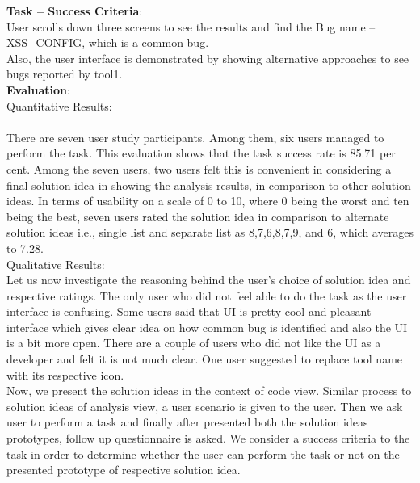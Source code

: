 \textbf{Task – Success Criteria}: \\

User scrolls down three screens to see the results and find the Bug name – XSS\_CONFIG, which is a common bug. \\

Also, the user interface is demonstrated by showing alternative approaches to see bugs reported by tool1. \\

\textbf{Evaluation}: \\

Quantitative Results: \\ \\
There are seven user study participants. Among them, six users managed to perform the task. This evaluation shows that the task success rate is 85.71 per cent. Among the seven users, two users felt this is convenient in considering a final solution idea in showing the analysis results, in comparison to other solution ideas. In terms of usability on a scale of 0 to 10, where 0 being the worst and ten being the best, seven users rated the solution idea in comparison to alternate solution ideas i.e., single list and separate list as 8,7,6,8,7,9, and 6, which averages to 7.28. \\

Qualitative Results: \\

Let us now investigate the reasoning behind the user’s choice of solution idea and respective ratings. The only user who did not feel able to do the task as the user interface is confusing. Some users said that UI is pretty cool and pleasant interface which gives clear idea on how common bug is identified and also the UI is a bit more open. There are a couple of users who did not like the UI as a developer and felt it is not much clear. One user suggested to replace tool name with its respective icon. \\

Now, we present the solution ideas in the context of code view. Similar process to solution ideas of analysis view, a user scenario is given to the user. Then we ask user to perform a task and finally after presented both the solution ideas prototypes, follow up questionnaire is asked. We consider a success criteria to the task in order to determine whether the user can perform the task or not on the presented prototype of respective solution idea. \\

